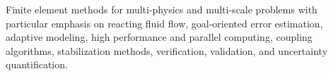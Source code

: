 Finite element methods for multi-physics and multi-scale problems with particular
emphasis on reacting fluid flow,
goal-oriented error estimation, adaptive modeling, high performance and
parallel computing,
coupling algorithms, stabilization methods, verification, validation,
and uncertainty quantification.

